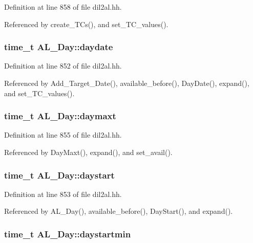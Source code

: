 Definition at line 858 of file dil2al.hh.

Referenced by create\_\-TCs(), and set\_\-TC\_\-values().
\subsubsection{\setlength{\rightskip}{0pt plus 5cm}time\_\-t AL\_\-Day::daydate\hspace{0.3cm}{\tt  [protected]}}\label{classAL__Day_n3}




Definition at line 852 of file dil2al.hh.

Referenced by Add\_\-Target\_\-Date(), available\_\-before(), Day\-Date(), expand(), and set\_\-TC\_\-values().
\subsubsection{\setlength{\rightskip}{0pt plus 5cm}time\_\-t AL\_\-Day::daymaxt\hspace{0.3cm}{\tt  [protected]}}\label{classAL__Day_n6}




Definition at line 855 of file dil2al.hh.

Referenced by Day\-Maxt(), expand(), and set\_\-avail().
\subsubsection{\setlength{\rightskip}{0pt plus 5cm}time\_\-t AL\_\-Day::daystart\hspace{0.3cm}{\tt  [protected]}}\label{classAL__Day_n4}




Definition at line 853 of file dil2al.hh.

Referenced by AL\_\-Day(), available\_\-before(), Day\-Start(), and expand().
\subsubsection{\setlength{\rightskip}{0pt plus 5cm}time\_\-t AL\_\-Day::daystartmin\hspace{0.3cm}{\tt  [protected]}}\label{classAL__Day_n5}




